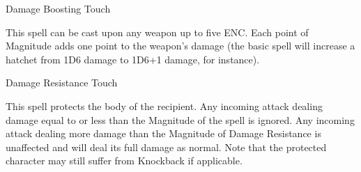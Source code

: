%
%
%
%

\begin{rpg-spell}
{Damage Boosting}
{Touch}

This spell can be cast upon any weapon up to five ENC. Each point of Magnitude adds one point to the weapon’s damage (the basic spell will increase a hatchet from 1D6 damage to 1D6+1 damage, for instance). 
\end{rpg-spell}


\begin{rpg-spell}
{Damage Resistance}
{Touch}

This spell protects the body of the recipient. Any incoming attack dealing damage equal to or less than the Magnitude of the spell is ignored. Any incoming attack dealing more damage than the Magnitude of Damage Resistance is unaffected and will deal its full damage as normal. Note that the protected character may still suffer from Knockback if applicable. 
\end{rpg-spell}


